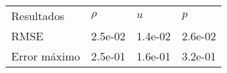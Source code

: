 \begin{tabular}{llll}
Resultados & $\rho$ & $u$ & $p$ \\
RMSE & 2.5e-02 & 1.4e-02 & 2.6e-02 \\
Error máximo & 2.5e-01 & 1.6e-01 & 3.2e-01 \\
\end{tabular}
